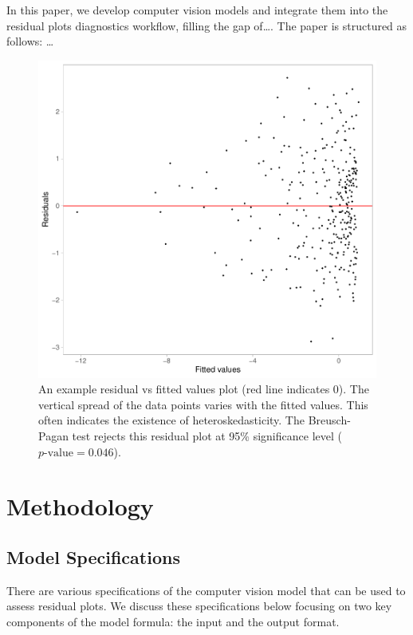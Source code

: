 \documentclass[]{interact}
\theoremstyle{plain}%
\theoremstyle{definition}
\theoremstyle{remark}
\begin{document}
In this paper, we develop computer vision models and integrate them into
the residual plots diagnostics workflow, filling the gap of\ldots. The
paper is structured as follows: \ldots{}

\begin{figure}[!h]

{\centering \includegraphics[width=1\linewidth]{paper_files/figure-latex/false-finding-1} 

}

\caption{An example residual vs fitted values plot (red line indicates 0). The vertical spread of the data points varies with the fitted values. This often indicates the existence of heteroskedasticity. The Breusch-Pagan test rejects this residual plot at 95\% significance level ($p\text{-value} = 0.046$).}\label{fig:false-finding}
\end{figure}

\section{Methodology}\label{methodology}

\subsection{Model Specifications}\label{model-specifications}

There are various specifications of the computer vision model that can
be used to assess residual plots. We discuss these specifications below
focusing on two key components of the model formula: the input and the
output format.
\end{document}
